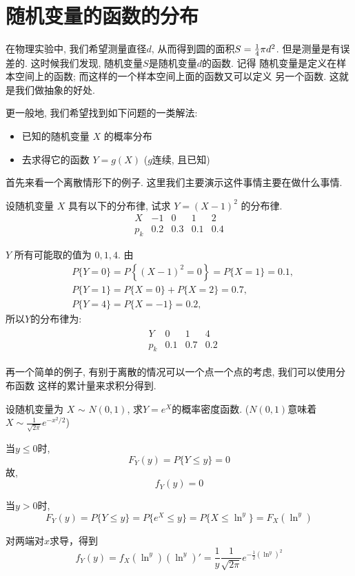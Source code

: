 \section{随机变量的函数的分布}

在物理实验中, 我们希望测量直径$d$, 从而得到圆的面积$S={1\over4} \pi d^2$. 
但是测量是有误差的. 这时候我们发现, 随机变量$S$是随机变量$d$的函数. 记得
随机变量是定义在样本空间上的函数; 而这样的一个样本空间上面的函数又可以定义
另一个函数. 这就是我们做抽象的好处. 

更一般地, 我们希望找到如下问题的一类解法: 
\begin{itemize}
    \item 已知的随机变量 $X$ 的概率分布
    \item 去求得它的函数 $Y=g(X)$ ($g$连续, 且已知)
\end{itemize}

首先来看一个离散情形下的例子. 这里我们主要演示这件事情主要在做什么事情. 

\begin{example}
  设随机变量 $X$ 具有以下的分布律, 试求 $Y=(X-1)^2$ 的分布律.
  $$
\begin{array}{c|cccc}
X & -1 & 0 & 1 & 2 \\
\hline p_k & 0.2 & 0.3 & 0.1 & 0.4
\end{array}
$$
\end{example}

\begin{solution}
  $Y$ 所有可能取的值为 $0,1,4$. 由
$$
\begin{aligned}
& P\{Y=0\}=P\left\{(X-1)^2=0\right\}=P\{X=1\}=0.1, \\
& P\{Y=1\}=P\{X=0\}+P\{X=2\}=0.7, \\
& P\{Y=4\}=P\{X=-1\}=0.2,
\end{aligned}
$$
所以$Y$的分布律为: 
$$
\begin{aligned}
&\begin{array}{c|ccc}
Y & 0 & 1 & 4 \\
\hline p_k & 0.1 & 0.7 & 0.2
\end{array}
\end{aligned}
$$
\end{solution}

再一个简单的例子, 有别于离散的情况可以一个点一个点的考虑, 我们可以使用分布函数
这样的累计量来求积分得到.  

\begin{example}
  设随机变量为 $X$ $\sim$ $N (0, 1)$, 求$Y = e^{X}$的概率密度函数. 
  ($N(0,1)$意味着$X\sim \frac1{\sqrt{2\pi}}e^{-x^2/2}$)
\end{example}
\begin{solution}
  当$y \leq 0$时,
  \[F_Y(y) = P\{Y \leq y\} = 0\]
  \quad 故,
  \[f_Y(y) = 0\]
  
  
  \quad 当$y > 0$时,
  \[F_Y(y) = P\{Y \leq y\} = P\{ e^{X} \leq y\} = P\{X \leq \ln^{y}\}= F_X(\ln^{y})\]
  
  \quad 对两端对$x$求导，得到
  \[f_Y(y) = f_X(\ln^{y})(\ln^{y})' = \frac{1}{y}\frac{1}{\sqrt{2\pi}}e^{-\frac{1}{2}(\ln^y)^2}\]

\end{solution}

